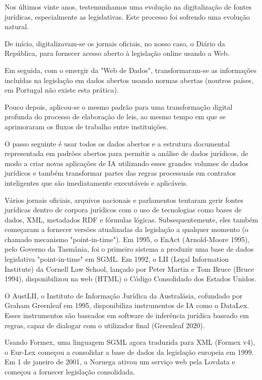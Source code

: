 Nos últimos vinte anos, testemunhamos uma evolução na digitalização de fontes 
jurídicas, especialmente as legislativas. Este processo foi sofrendo uma evolução
natural.

De início, digitalizavam-se os jornais oficiais, no nosso caso, o Diário da República, para fornecer acesso aberto à 
legislação online usando a Web. 

Em seguida, com o emergir da "Web de Dados", transformaram-se as informações incluídas na legislação em dados abertos usando 
normas abertas (noutros países, em Portugal não existe esta prática). 

Pouco depois, aplicou-se o mesmo padrão para uma transformação digital profunda do processo de elaboração de leis, 
ao mesmo tempo em que se aprimoraram os fluxos de trabalho entre instituições. 

O passo seguinte é usar todos os dados abertos e a estrutura documental representada em padrões abertos para permitir a 
análise de dados jurídicos, de modo a criar novas aplicações de IA utilizando esses grandes volumes de dados jurídicos e 
também transformar partes das regras processuais em contratos inteligentes que são imediatamente executáveis e aplicáveis.

Vários jornais oficiais, arquivos nacionais e parlamentos tentaram gerir fontes jurídicas dentro de corpora jurídicos com o uso 
de tecnologias como bases de dados, XML, metadados RDF e fórmulas lógicas. 
Subsequentemente, eles também começaram a fornecer versões atualizadas da legislação a qualquer momento 
(o chamado mecanismo "point-in-time"). 
Em 1995, o EnAct (Arnold-Moore 1995), pelo Governo da Tasmânia, foi o primeiro sistema a produzir uma base de dados legislativa 
"point-in-time" em SGML. 
Em 1992, o LII (Legal Information Institute) da Cornell Law School, lançado por Peter Martin e Tom Bruce (Bruce 1994), 
disponibilizou na web (HTML) o Código Consolidado dos Estados Unidos. 

O AustLII, o Instituto de Informação Jurídica da Australásia, cofundado por Graham Greenleaf em 1995, disponibiliza instrumentos 
de IA como o DataLex. Esses instrumentos são baseados em software de inferência jurídica baseado em regras, capaz de dialogar 
com o utilizador final (Greenleaf 2020).

Usando Formex, uma linguagem SGML agora traduzida para XML (Formex v4), o Eur-Lex começou a consolidar a base de dados da 
legislação europeia em 1999. 
Em 1 de janeiro de 2001, a Noruega ativou um serviço web pela Lovdata e começou a fornecer legislação consolidada. 

